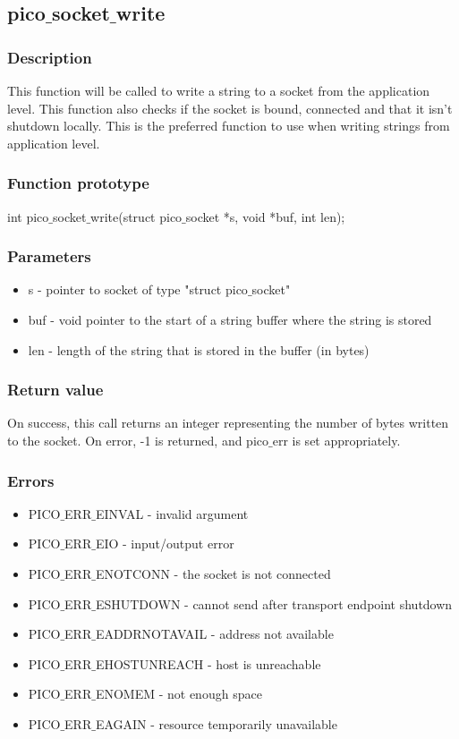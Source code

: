 \subsection{pico$\_$socket$\_$write}

\subsubsection*{Description}
This function will be called to write a string to a socket from the application level.
This function also checks if the socket is bound, connected and that it isn't shutdown
locally. This is the preferred function to use when writing strings from application
level. 

\subsubsection*{Function prototype}
int pico$\_$socket$\_$write(struct pico$\_$socket *s, void *buf, int len);

\subsubsection*{Parameters}
\begin{itemize}
\item s - pointer to socket of type "struct pico$\_$socket"
\item buf - void pointer to the start of a string buffer where the string is stored
\item len - length of the string that is stored in the buffer (in bytes)
\end{itemize}

\subsubsection*{Return value}
On success, this call returns an integer representing the number of bytes written to the socket.
On error, -1 is returned, and pico$\_$err is set appropriately.

\subsubsection*{Errors}
\begin{itemize}
\item PICO$\_$ERR$\_$EINVAL - invalid argument
\item PICO$\_$ERR$\_$EIO - input/output error
\item PICO$\_$ERR$\_$ENOTCONN - the socket is not connected
\item PICO$\_$ERR$\_$ESHUTDOWN - cannot send after transport endpoint shutdown
\item PICO$\_$ERR$\_$EADDRNOTAVAIL - address not available
\item PICO$\_$ERR$\_$EHOSTUNREACH - host is unreachable
\item PICO$\_$ERR$\_$ENOMEM - not enough space
\item PICO$\_$ERR$\_$EAGAIN - resource temporarily unavailable
\end{itemize}

